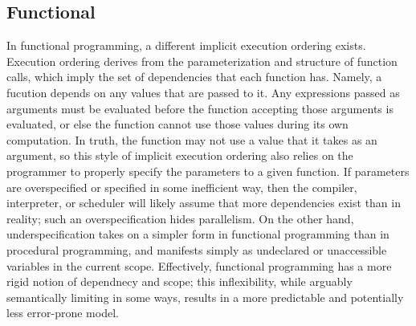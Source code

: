 \subsection{Functional}
In functional programming, a different implicit execution ordering exists.
Execution ordering derives from the parameterization and structure of function
calls, which imply the set of dependencies that each function has. Namely, a
fucution depends on any values that are passed to it. Any expressions passed as
arguments must be evaluated before the function accepting those arguments is
evaluated, or else the function cannot use those values during its own
computation. In truth, the function may not use a value that it takes as an
argument, so this style of implicit execution ordering also relies on the
programmer to properly specify the parameters to a given function. If parameters
are overspecified or specified in some inefficient way, then the compiler,
interpreter, or scheduler will likely assume that more dependencies exist than
in reality; such an overspecification hides parallelism. On the other hand,
underspecification takes on a simpler form in functional programming than in
procedural programming, and manifests simply as undeclared or unaccessible
variables in the current scope. Effectively, functional programming has a more
rigid notion of dependnecy and scope; this inflexibility, while arguably
semantically limiting in some ways, results in a more predictable and
potentially less error-prone model.

